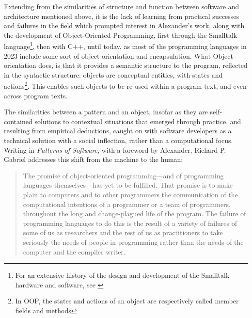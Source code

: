 Extending from the similarities of structure and function between software and architecture mentioned above, it is the lack of learning from practical successes and failures in the field which prompted interest in Alexander's work, along with the development of Object-Oriented Programming, first through the Smalltalk language\footnote{For an extensive history of the design and development of the Smalltalk hardware and software, see \citep{kay_early_1993}}, then with C++, until today, as most of the programming languages in 2023 include some sort of object-orientation and encapsulation. What Object-orientation does, is that it provides a semantic structure to the program, reflected in the syntactic structure: objects are conceptual entities, with states and actions\footnote{In OOP, the states and actions of an object are respectively called member fields and methods}. This enables such objects to be re-used within a program text, and even across program texts.

The similarities between a pattern and an object, insofar as they are self-contained solutions to contextual situations that emerged through practice, and resulting from empirical deductions, caught on with software developers as a technical solution with a social inflection, rather than a computational focus. Writing in \emph{Patterns of Software}, with a foreword by Alexander, Richard P. Gabriel addresses this shift from the machine to the human:

\begin{quote}
    The promise of object-oriented programming—and of programming languages themselves—has yet to be fulfilled. That promise is to make plain to computers and to other programmers the communication of the computational intentions of a programmer or a team of programmers, throughout the long and change-plagued life of the program. The failure of programming languages to do this is the result of a variety of failures of some of us as researchers and the rest of us as practitioners to take seriously the needs of people in programming rather than the needs of the computer and the compiler writer. \citep{gabriel_patterns_1998}
\end{quote}

